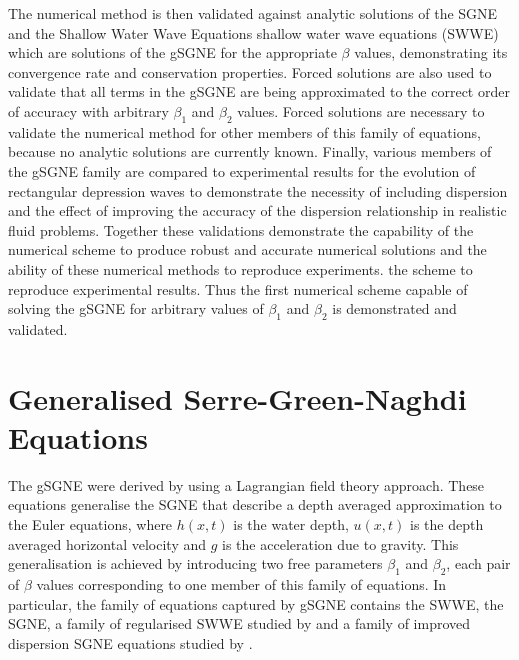 \documentclass[10pt]{elsarticle}
\providecommand{\DIFaddtex}[1]{{\protect\color{blue} \sf #1}} %
\providecommand{\DIFdeltex}[1]{{\protect\color{red} \scriptsize #1}} %
\providecommand{\DIFaddbegin}{} %
\providecommand{\DIFaddend}{} %
\providecommand{\DIFdelbegin}{} %
\providecommand{\DIFdelend}{} %
\providecommand{\DIFadd}[1]{\texorpdfstring{\DIFaddtex{#1}}{#1}} %
\providecommand{\DIFdel}[1]{\texorpdfstring{\DIFdeltex{#1}}{}} %
\newcommand{\DIFscaledelfig}{0.5}
\newlength{\DIFdelgraphicswidth} %
\newlength{\DIFdelgraphicsheight} %
\newcommand{\DIFaddincludegraphics}[2][]{{\color{blue}\fbox{\DIFOincludegraphics[#1]{#2}}}} %
\newcommand{\DIFdelincludegraphics}[2][]{%
\sbox{\DIFdelgraphicsbox}{\DIFOincludegraphics[#1]{#2}}%
\settoboxwidth{\DIFdelgraphicswidth}{\DIFdelgraphicsbox} %
\settoboxtotalheight{\DIFdelgraphicsheight}{\DIFdelgraphicsbox} %
\scalebox{\DIFscaledelfig}{%
\parbox[b]{\DIFdelgraphicswidth}{\usebox{\DIFdelgraphicsbox}\\[-\baselineskip] \rule{\DIFdelgraphicswidth}{0em}}\llap{\resizebox{\DIFdelgraphicswidth}{\DIFdelgraphicsheight}{%
\setlength{\unitlength}{\DIFdelgraphicswidth}%
\begin{picture}(1,1)%
\thicklines\linethickness{2pt} %
{\color[rgb]{1,0,0}\put(0,0){\framebox(1,1){}}}%
{\color[rgb]{1,0,0}\put(0,0){\line( 1,1){1}}}%
{\color[rgb]{1,0,0}\put(0,1){\line(1,-1){1}}}%
\end{picture}%
}\hspace*{3pt}}} %
} %
\DeclareRobustCommand{\DIFaddbegin}{\DIFOaddbegin \let\includegraphics\DIFaddincludegraphics} %
\DeclareRobustCommand{\DIFaddend}{\DIFOaddend \let\includegraphics\DIFOincludegraphics} %
\DeclareRobustCommand{\DIFdelbegin}{\DIFOdelbegin \let\includegraphics\DIFdelincludegraphics} %
\DeclareRobustCommand{\DIFdelend}{\DIFOaddend \let\includegraphics\DIFOincludegraphics} %
\begin{document}
\DIFdelend The numerical method is then validated against analytic solutions of the SGNE and the \DIFdelbegin \DIFdel{Shallow Water Wave Equations }\DIFdelend \DIFaddbegin \DIFadd{shallow water wave equations }\DIFaddend (SWWE) which are solutions of the gSGNE for the appropriate $\beta$ values, demonstrating its convergence rate and conservation properties. Forced solutions are also used to validate that all terms in the gSGNE are being approximated to the correct order of accuracy with arbitrary $\beta_1$ and $\beta_2$ values. Forced solutions are necessary to validate the numerical method for other members of this family of equations, because no analytic solutions are currently known. Finally, various members of the gSGNE family are compared to experimental results for the evolution of rectangular depression waves to demonstrate the necessity of including dispersion and the effect of improving the accuracy of the dispersion relationship in realistic fluid problems. Together these validations demonstrate the capability of the numerical scheme to produce robust and accurate numerical solutions and the ability of \DIFdelbegin \DIFdel{these numerical methods to reproduce experiments. %
}\DIFdelend \DIFaddbegin \DIFadd{the scheme to reproduce experimental results. Thus the first numerical scheme capable of solving the gSGNE for arbitrary values of $\beta_1$ and $\beta_2$ is demonstrated and validated. 
}\DIFaddend 

\section{Generalised Serre-Green-Naghdi Equations}
The gSGNE were derived by \citet{Clamond-Dutykh-2018-237} using a Lagrangian field theory approach. These equations generalise the SGNE that describe a depth averaged approximation to the Euler equations, where $h(x,t)$ is the water depth, $u(x,t)$ is the depth averaged horizontal velocity and $g$ is the acceleration due to gravity. This generalisation is achieved by introducing two free parameters $\beta_1$ and $\beta_2$, each pair of $\beta$ values corresponding to one member of this family of equations. In particular, the family of equations captured by gSGNE contains the SWWE, the SGNE, a family of regularised SWWE studied by \citet{Clamond-Dutykh-2018-237} and a family of improved dispersion SGNE equations studied by \citet{Clamond-et.al-2017-245}.
\end{document}
